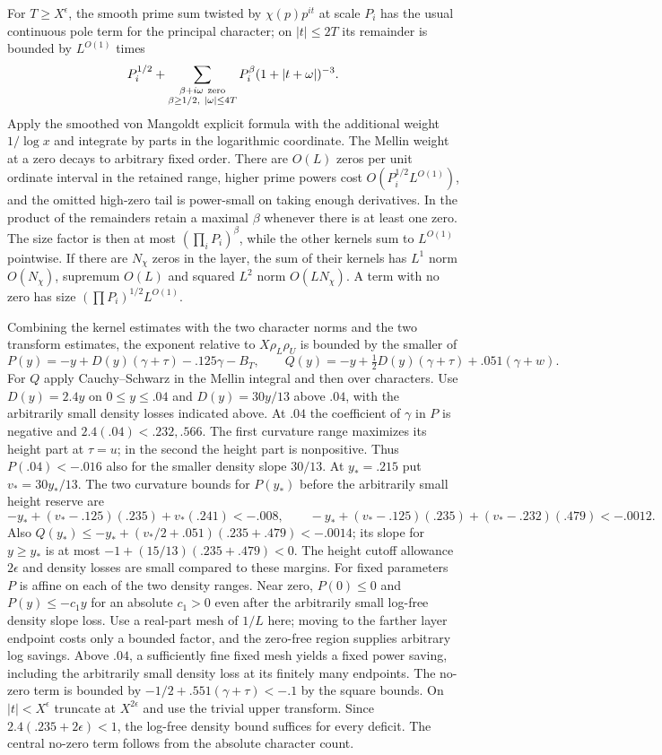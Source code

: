 \documentclass[11pt,a4paper]{article}
\theoremstyle{paperplain}
\numberwithin{equation}{section}
\begin{document}
For $T\ge X^\epsilon$, the smooth prime sum twisted by $\chi(p)p^{it}$
at scale $P_i$ has the usual continuous pole term for the principal
character; on $|t|\le2T$ its remainder is bounded by $L^{O(1)}$ times
\[
 P_i^{1/2}+
 \sum_{\substack{\beta+i\omega\ {\rm zero}\\
     \beta\ge1/2,\ |\omega|\le4T}}
             P_i^\beta(1+|t+\omega|)^{-3}.
\]
Apply the smoothed von Mangoldt explicit formula with the additional
weight $1/\log x$ and integrate by parts in the logarithmic coordinate.
The Mellin weight at a zero decays to arbitrary fixed order. There
are $O(L)$ zeros per unit ordinate interval in the retained range,
higher prime powers cost $O(P_i^{1/2}L^{O(1)})$, and the omitted
high-zero tail is power-small on taking enough derivatives.
In the product of the remainders retain a maximal $\beta$ whenever
there is at least one zero. The size factor is then at most
$(\prod_i P_i)^\beta$, while the other kernels sum to $L^{O(1)}$
pointwise. If there are $N_\chi$ zeros in the layer, the sum of
their kernels has $L^1$ norm $O(N_\chi)$, supremum $O(L)$ and
squared $L^2$ norm $O(LN_\chi)$. A term with no zero has size
$(\prod P_i)^{1/2}L^{O(1)}$.

Combining the kernel estimates with the two character norms and
the two transform estimates, the exponent relative to $X\rho_L\rho_U$
is bounded by the smaller of
\[
 P(y)=-y+D(y)(\gamma+\tau)-.125\gamma-B_T,\qquad
 Q(y)=-y+\tfrac12D(y)(\gamma+\tau)+.051(\gamma+w).
\]
For $Q$ apply Cauchy--Schwarz in the Mellin integral and then over
characters. Use $D(y)=2.4y$ on $0\le y\le.04$ and $D(y)=30y/13$
above $.04$, with the arbitrarily small density losses indicated above.
At $.04$ the coefficient of $\gamma$ in $P$ is negative and
$2.4(.04)<.232,.566$. The first curvature range maximizes its
height part at $\tau=u$; in the second the height part is nonpositive.
Thus $P(.04)<-.016$ also for the smaller density slope $30/13$.
At $y_*=.215$ put $v_*=30y_*/13$. The two curvature bounds for
$P(y_*)$ before the arbitrarily small height reserve are
\[
 -y_*+(v_*-.125)(.235)+v_*(.241)<-.008,\qquad
 -y_*+(v_*-.125)(.235)+(v_*-.232)(.479)<-.0012.
\]
Also $Q(y_*)\le-y_*+(v_*/2+.051)(.235+.479)<-.0014$; its
slope for $y\ge y_*$ is at most $-1+(15/13)(.235+.479)<0$.
The height cutoff allowance $2\epsilon$ and density losses are small
compared to these margins. For fixed parameters $P$ is affine on each
of the two density ranges. Near zero, $P(0)\le0$ and
$P(y)\le-c_1 y$ for an absolute $c_1>0$ even after the arbitrarily
small log-free density slope loss. Use a real-part mesh of $1/L$ here;
moving to the farther layer endpoint costs only a bounded factor,
and the zero-free region supplies arbitrary log savings. Above $.04$,
a sufficiently fine fixed mesh yields a fixed power saving, including
the arbitrarily small density loss at its finitely many endpoints.
The no-zero term is bounded by $-1/2+.551(\gamma+\tau)<-.1$
by the square bounds. On $|t|<X^\epsilon$ truncate at $X^{2\epsilon}$
and use the trivial upper transform. Since $2.4(.235+2\epsilon)<1$,
the log-free density bound suffices for every deficit. The central
no-zero term follows from the absolute character count.
\end{document}
